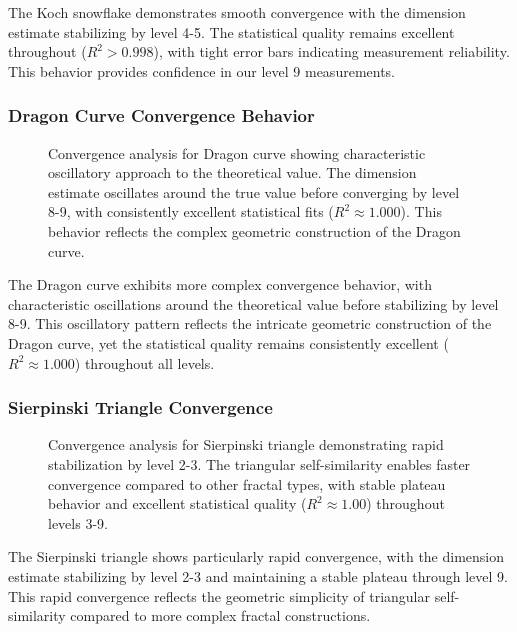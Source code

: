 \documentclass[preprint,12pt]{elsarticle}
\begin{document}
The Koch snowflake demonstrates smooth convergence with the dimension estimate stabilizing by level 4-5. The statistical quality remains excellent throughout ($R^2 > 0.998$), with tight error bars indicating measurement reliability. This behavior provides confidence in our level 9 measurements.

\subsubsection{Dragon Curve Convergence Behavior}

\begin{figure}[ht]
\centering
\caption{Convergence analysis for Dragon curve showing characteristic oscillatory approach to the theoretical value. The dimension estimate oscillates around the true value before converging by level 8-9, with consistently excellent statistical fits ($R^2 \approx 1.000$). This behavior reflects the complex geometric construction of the Dragon curve.}
\label{fig:dragon_convergence}
\end{figure}

The Dragon curve exhibits more complex convergence behavior, with characteristic oscillations around the theoretical value before stabilizing by level 8-9. This oscillatory pattern reflects the intricate geometric construction of the Dragon curve, yet the statistical quality remains consistently excellent ($R^2 \approx 1.000$) throughout all levels.

\subsubsection{Sierpinski Triangle Convergence}

\begin{figure}[ht]
\centering
\caption{Convergence analysis for Sierpinski triangle demonstrating rapid stabilization by level 2-3. The triangular self-similarity enables faster convergence compared to other fractal types, with stable plateau behavior and excellent statistical quality ($R^2 \approx 1.00$) throughout levels 3-9.}
\label{fig:sierpinski_convergence}
\end{figure}

The Sierpinski triangle shows particularly rapid convergence, with the dimension estimate stabilizing by level 2-3 and maintaining a stable plateau through level 9. This rapid convergence reflects the geometric simplicity of triangular self-similarity compared to more complex fractal constructions.
\end{document}

